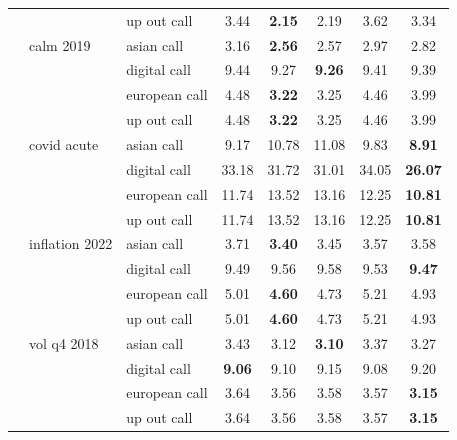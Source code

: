 \begin{table}[H]
\begin{tabular}{lllccccc}
 &  & up out call & 3.44 & \textbf{2.15} & 2.19 & 3.62 & 3.34 \\
 & calm 2019 & asian call & 3.16 & \textbf{2.56} & 2.57 & 2.97 & 2.82 \\
 &  & digital call & 9.44 & 9.27 & \textbf{9.26} & 9.41 & 9.39 \\
 &  & european call & 4.48 & \textbf{3.22} & 3.25 & 4.46 & 3.99 \\
 &  & up out call & 4.48 & \textbf{3.22} & 3.25 & 4.46 & 3.99 \\
 & covid acute & asian call & 9.17 & 10.78 & 11.08 & 9.83 & \textbf{8.91} \\
 &  & digital call & 33.18 & 31.72 & 31.01 & 34.05 & \textbf{26.07} \\
 &  & european call & 11.74 & 13.52 & 13.16 & 12.25 & \textbf{10.81} \\
 &  & up out call & 11.74 & 13.52 & 13.16 & 12.25 & \textbf{10.81} \\
 & inflation 2022 & asian call & 3.71 & \textbf{3.40} & 3.45 & 3.57 & 3.58 \\
 &  & digital call & 9.49 & 9.56 & 9.58 & 9.53 & \textbf{9.47} \\
 &  & european call & 5.01 & \textbf{4.60} & 4.73 & 5.21 & 4.93 \\
 &  & up out call & 5.01 & \textbf{4.60} & 4.73 & 5.21 & 4.93 \\
 & vol q4 2018 & asian call & 3.43 & 3.12 & \textbf{3.10} & 3.37 & 3.27 \\
 &  & digital call & \textbf{9.06} & 9.10 & 9.15 & 9.08 & 9.20 \\
 &  & european call & 3.64 & 3.56 & 3.58 & 3.57 & \textbf{3.15} \\
 &  & up out call & 3.64 & 3.56 & 3.58 & 3.57 & \textbf{3.15} \\
\bottomrule
\end{tabular}
\end{table}
